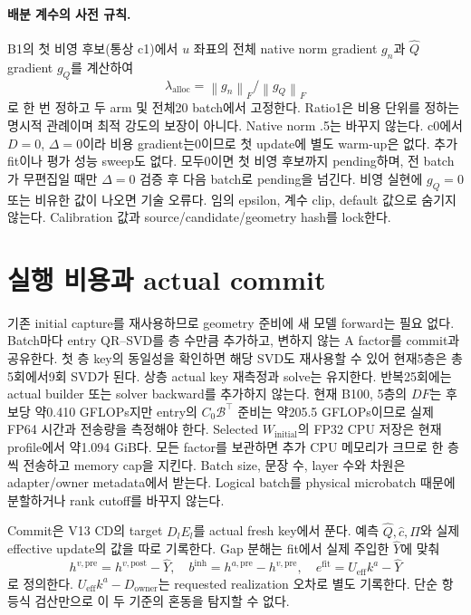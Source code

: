 \documentclass[11pt]{article}
\newcommand{\norm}[1]{\left\lVert #1\right\rVert}
\begin{document}
\paragraph{배분 계수의 사전 규칙.}
B1의 첫 비영 후보(통상 c1)에서 $u$ 좌표의 전체 native norm gradient $g_n$과
$\widehat Q$ gradient $g_Q$를 계산하여
\[
 \lambda_{\mathrm{alloc}}=\norm{g_n}_F/\norm{g_Q}_F
\]
로 한 번 정하고 두 arm 및 전체20 batch에서 고정한다. Ratio1은 비용 단위를 정하는
명시적 관례이며 최적 강도의 보장이 아니다. Native norm .5는 바꾸지 않는다.
c0에서 $D=0$, $\Delta=0$이라 비용 gradient는0이므로 첫 update에 별도 warm-up은 없다.
추가 fit이나 평가 성능 sweep도 없다. 모두0이면 첫 비영 후보까지 pending하며,
전 batch가 무편집일 때만 $\Delta=0$ 검증 후 다음 batch로 pending을 넘긴다.
비영 실현에 $g_Q=0$ 또는 비유한 값이 나오면 기술 오류다. 임의 epsilon, 계수 clip,
default 값으로 숨기지 않는다. Calibration 값과 source/candidate/geometry hash를 lock한다.

\section{실행 비용과 actual commit}
기존 initial capture를 재사용하므로 geometry 준비에 새 모델 forward는 필요 없다.
Batch마다 entry QR--SVD를 층 수만큼 추가하고, 변하지 않는 A factor를 commit과 공유한다.
첫 층 key의 동일성을 확인하면 해당 SVD도 재사용할 수 있어 현재5층은
총5회에서9회 SVD가 된다. 상층 actual key 재측정과 solve는 유지한다.
반복25회에는 actual builder 또는 solver backward를 추가하지 않는다.
현재 B100, 5층의 $D F$는 후보당 약0.410 GFLOPs지만 entry의 $C_0\mathcal B^\top$
준비는 약205.5 GFLOPs이므로 실제 FP64 시간과 전송량을 측정해야 한다.
Selected $W_{\mathrm{initial}}$의 FP32 CPU 저장은 현재 profile에서 약1.094 GiB다.
모든 factor를 보관하면 추가 CPU 메모리가 크므로 한 층씩 전송하고 memory cap을 지킨다.
Batch size, 문장 수, layer 수와 차원은 adapter/owner metadata에서 받는다.
Logical batch를 physical microbatch 때문에 분할하거나 rank cutoff를 바꾸지 않는다.

Commit은 V13 CD의 target $D_lE_l$를 actual fresh key에서 푼다.
예측 $\widehat Q,\widehat c,\Pi$와 실제 effective update의 값을 따로 기록한다.
Gap 분해는 fit에서 실제 주입한 $\widehat Y$에 맞춰
\[
 h^{v,\mathrm{pre}}=h^{v,\mathrm{post}}-\widehat Y,\quad
 b^{\mathrm{inh}}=h^{a,\mathrm{pre}}-h^{v,\mathrm{pre}},\quad
 e^{\mathrm{fit}}=U_{\mathrm{eff}}k^a-\widehat Y
\]
로 정의한다. $U_{\mathrm{eff}}k^a-D_{\mathrm{owner}}$는 requested realization 오차로
별도 기록한다. 단순 항등식 검산만으로 이 두 기준의 혼동을 탐지할 수 없다.
\end{document}
